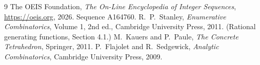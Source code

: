 \documentclass[11pt,a4paper]{article}
\theoremstyle{plain}
\theoremstyle{definition}
\begin{document}
\begin{thebibliography}{9}
 The OEIS Foundation, \emph{The On-Line Encyclopedia of Integer
Sequences}, \url{https://oeis.org}, 2026. Sequence A164760.
 R.~P.~Stanley, \emph{Enumerative Combinatorics}, Volume 1, 2nd ed.,
Cambridge University Press, 2011. (Rational generating functions, Section 4.1.)
 M.~Kauers and P.~Paule, \emph{The Concrete Tetrahedron}, Springer, 2011.
 P.~Flajolet and R.~Sedgewick, \emph{Analytic Combinatorics}, Cambridge
University Press, 2009.
\end{thebibliography}
\end{document}
